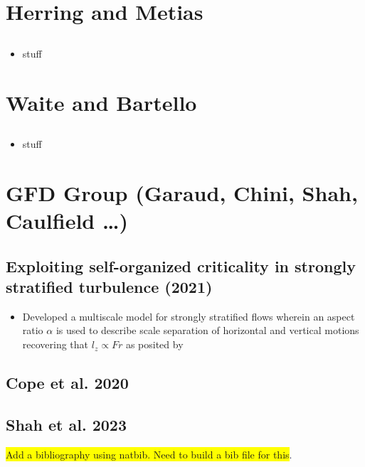 \documentclass{article}
\begin{document}
\section{Herring and Metias}
    \subsection{}
    \begin{itemize}
        \item stuff
    \end{itemize}

\section{Waite and Bartello}
    \subsection{}
    \begin{itemize}
        \item stuff
    \end{itemize}


\section{GFD Group (Garaud, Chini, Shah, Caulfield \ldots)}
    \subsection{Exploiting self-organized criticality in strongly stratified
    turbulence (2021)}
    \begin{itemize}
        \item Developed a multiscale model for strongly stratified flows wherein an
        aspect ratio $\alpha$ is used to describe scale separation of horizontal and
        vertical motions recovering that $l_z \propto Fr$ as posited by
    \end{itemize}

    \subsection{Cope et al. 2020}

    \subsection{Shah et al. 2023}

\colorbox{yellow}{Add a bibliography using natbib. Need to build a bib file for this}. 
\end{document}
